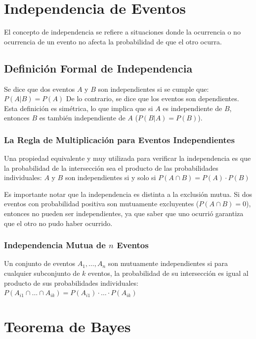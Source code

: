 \documentclass[a4paper]{article}
\begin{document}
\section{Independencia de Eventos}

El concepto de independencia se refiere a situaciones donde la ocurrencia o no ocurrencia de un evento no afecta la probabilidad de que el otro ocurra.

\subsection{Definición Formal de Independencia}

Se dice que dos eventos $A$ y $B$ son independientes si se cumple que:
$P(A | B) = P(A)$
De lo contrario, se dice que los eventos son dependientes. Esta definición es simétrica, lo que implica que si $A$ es independiente de $B$, entonces $B$ es también independiente de $A$ ($P(B | A) = P(B)$).

\subsubsection{La Regla de Multiplicación para Eventos Independientes}

Una propiedad equivalente y muy utilizada para verificar la independencia es que la probabilidad de la intersección sea el producto de las probabilidades individuales:
$A$ y $B$ son independientes si y solo si $P(A \cap B) = P(A) \cdot P(B)$

Es importante notar que la independencia es distinta a la exclusión mutua. Si dos eventos con probabilidad positiva son mutuamente excluyentes ($P(A \cap B) = 0$), entonces no pueden ser independientes, ya que saber que uno ocurrió garantiza que el otro no pudo haber ocurrido.

\subsubsection{Independencia Mutua de $n$ Eventos}

Un conjunto de eventos $A_1, \dots, A_n$ son mutuamente independientes si para cualquier subconjunto de $k$ eventos, la probabilidad de su intersección es igual al producto de sus probabilidades individuales:
$P(A_{i1} \cap \dots \cap A_{ik}) = P(A_{i1}) \cdot \dots \cdot P(A_{ik})$

\section{Teorema de Bayes}
\end{document}
